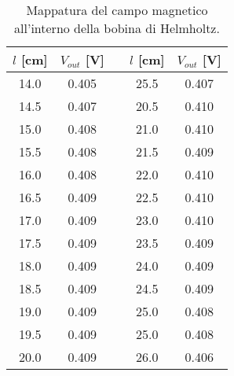 	\begin{table}[h]
		\centering
		\begin{tabular}{ccccc}
			\toprule
			$l$ [\si{cm}]	& 	$V_{out}$ [\si{\volt}]	&& 	$l$ [\si{cm}]	& 	$V_{out}$ [\si{\volt}] \\
			\midrule
			14.0 	& 	 0.405	&&	25.5	& 	 0.407 \\
			14.5	& 	 0.407	&&	20.5	& 	 0.410 \\
			15.0	& 	 0.408	&&	21.0	& 	 0.410 \\
			15.5	& 	 0.408	&&	21.5	& 	 0.409 \\
			16.0	& 	 0.408	&&	22.0	& 	 0.410 \\
			16.5	& 	 0.409	&&	22.5	& 	 0.410 \\
			17.0	& 	 0.409	&&	23.0	& 	 0.410 \\
			17.5	& 	 0.409	&&	23.5	& 	 0.409 \\
			18.0	& 	 0.409	&&	24.0	& 	 0.409 \\
			18.5	& 	 0.409	&&	24.5	& 	 0.409 \\
			19.0	& 	 0.409	&&	25.0	& 	 0.408 \\
			19.5	& 	 0.409	&&	25.0	& 	 0.408 \\
			20.0	& 	 0.409	&&	26.0	& 	 0.406 \\
			\bottomrule
		\end{tabular}
		\caption{Mappatura del campo magnetico all'interno della bobina di Helmholtz.}
		\label{tab:a}
	\end{table}
